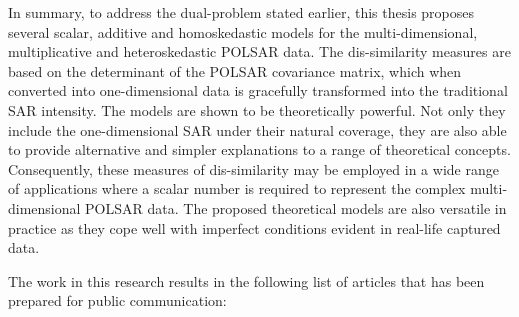 

In summary, to address the dual-problem stated earlier, this thesis proposes several
scalar, additive and homoskedastic models for the multi-dimensional, multiplicative
and heteroskedastic POLSAR data. 
The dis-similarity measures are based on the determinant of the POLSAR covariance matrix,
  which when converted into one-dimensional data
  is gracefully transformed into the traditional SAR intensity.
The models are shown to be theoretically powerful.
Not only they include the one-dimensional SAR under their natural coverage, 
they are also able to provide alternative and simpler explanations to a range of theoretical concepts. 
Consequently, these measures of dis-similarity may be employed in a wide range of applications
  where a scalar number is required to represent the complex multi-dimensional POLSAR data.
The proposed theoretical models are also versatile in practice
  as they cope well with imperfect conditions evident in real-life captured data.

The work in this research results in the following list of articles that has been prepared for public communication: 

